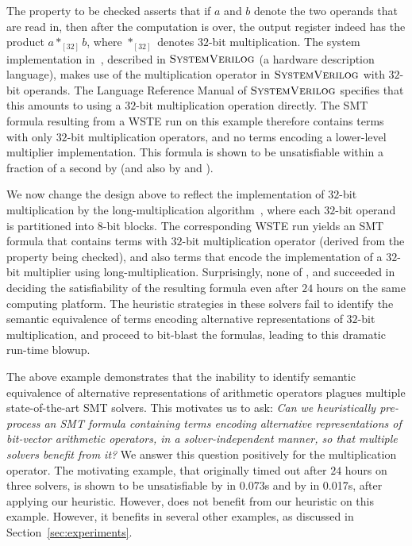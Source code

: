 The property to be checked asserts that if $a$ and $b$ denote the two
operands that are read in, then after the computation is over, the
output register indeed has the product $a *_{[32]} b$, where
$*_{[32]}$ denotes $32$-bit multiplication.  The system implementation
in~\cite{wste}, described in $\textsc{SystemVerilog}$ (a hardware description
language), makes use of the multiplication operator in $\textsc{SystemVerilog}$
with $32$-bit operands.  The Language Reference Manual of $\textsc{SystemVerilog}$
specifies that this amounts to using a $32$-bit multiplication
operation directly.  The SMT formula resulting from a WSTE run on this
example therefore contains terms with only $32$-bit multiplication
operators, and no terms encoding a lower-level multiplier
implementation.  This formula is shown to be unsatisfiable within a
fraction of a second by {\boolector} (and also by {\cvcfour} and
{\zthree}).%

We now change the design above to reflect the implementation of
$32$-bit multiplication by the long-multiplication
algorithm~\cite{long}, where each $32$-bit operand is partitioned into
$8$-bit blocks.  The corresponding WSTE run yields an SMT formula that
contains terms with $32$-bit multiplication operator (derived from the
property being checked), and also terms that encode the implementation
of a $32$-bit multiplier using long-multiplication.  Surprisingly,
none of {\boolector}, {\cvcfour} and {\zthree} succeeded in deciding
the satisfiability of the resulting formula even after $24$ hours on
the same computing platform.  The heuristic strategies in these
solvers fail to identify the semantic equivalence of terms encoding
alternative representations of $32$-bit multiplication, and proceed
to bit-blast the formulas, leading to this dramatic run-time blowup.

The above example demonstrates that the inability to identify semantic
equivalence of alternative representations of arithmetic operators
plagues multiple state-of-the-art SMT solvers.  %
This motivates us to ask: \emph{Can we heuristically pre-process an
SMT formula containing terms encoding alternative representations of
bit-vector arithmetic operators, in a solver-independent manner, so
that multiple solvers benefit from it?}  We answer this question
positively for the multiplication operator.  The motivating example,
that originally timed out after $24$ hours on three solvers, is shown
to be unsatisfiable by {\zthree} in 0.073s and by {\cvcfour} in
0.017s, after applying our heuristic. However, {\boolector} does not
benefit from our heuristic on this example.  However, it benefits in
several other examples, as discussed in Section~\ref{sec:experiments}.

